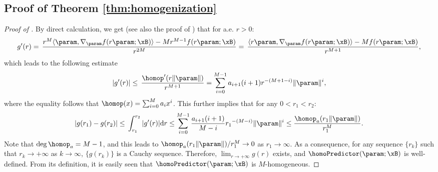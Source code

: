 \subsection{Proof of Theorem \ref{thm:homogenization}}
\begin{proof}[Proof of ]
By direct calculation, we get (see also the proof of ) that for a.e. $r > 0$:
\begin{align*}
g'(r) = \, \frac{r^M \langle \param, \nabla_{\param} f(r \param; \xB) \rangle - Mr^{M-1} f(r \param; \xB)}{r^{2M}} = \, \frac{\langle r \param, \nabla_{\param} f(r \param; \xB) \rangle - M f(r \param; \xB)}{r^{M+1}},
\end{align*}
which leads to the following estimate
\begin{equation*}
\left\vert g'(r) \right\vert \le \, \frac{\homop'(r \| \param \| )}{r^{M+1}} =  \sum_{i=0}^{M-1} a_{i+1} (i+1) r^{-(M+1-i)} \|\param\|^{i},
\end{equation*}
where the equality follows that $\homop (x) = \sum_{i=0}^M a_i x^i$. This further implies that for any $0 < r_1 < r_2$:
\begin{equation*}
\vert g(r_1) - g(r_2) \vert \le \, \int_{r_1}^{r_2} \vert g'(r) \vert \mathrm{d} r \le \sum_{i=0}^{M-1} \frac{a_{i+1} (i+1)}{M-i} {r_1}^{-(M-i)} \|\param\|^{i} \le \frac{\homop_a(r_1 \|\param\|)}{r_1^M}.
\end{equation*}
Note that $\deg \homop_a = M-1$, and this leads to $\homop_a(r_1\|\param\|) / r_1^M \to 0$ as $r_1 \to \infty$. As a consequence, for any sequence $\{ r_k \}$ such that $r_k \to +\infty$ as $k \to \infty$, $\{ g(r_k) \}$ is a Cauchy sequence. Therefore, $\lim_{r \to +\infty} g(r)$ exists, and $\homoPredictor (\param; \xB)$ is well-defined. From its definition, it is easily seen that $\homoPredictor (\param; \xB)$ is $M$-homogeneous.


\end{proof}
